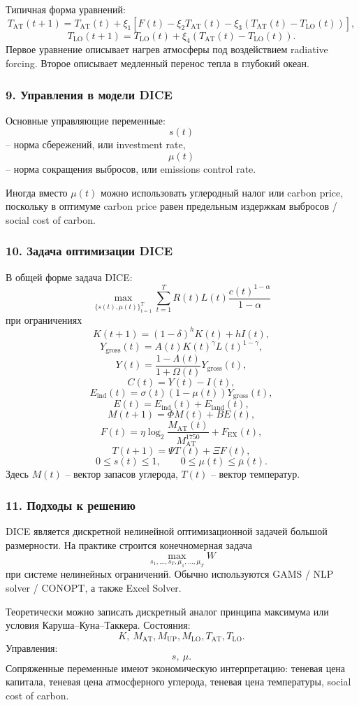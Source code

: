 \documentclass[12pt,a4paper]{article}
\begin{document}
Типичная форма уравнений:
\[
T_{\mathrm{AT}}(t+1)=T_{\mathrm{AT}}(t)+\xi_1\left[F(t)-\xi_2T_{\mathrm{AT}}(t)-\xi_3(T_{\mathrm{AT}}(t)-T_{\mathrm{LO}}(t))\right],
\]
\[
T_{\mathrm{LO}}(t+1)=T_{\mathrm{LO}}(t)+\xi_4(T_{\mathrm{AT}}(t)-T_{\mathrm{LO}}(t)).
\]
Первое уравнение описывает нагрев атмосферы под воздействием radiative forcing. Второе описывает медленный перенос тепла в глубокий океан.

\subsubsection*{9. Управления в модели DICE}
Основные управляющие переменные:
\[
s(t)
\]
-- норма сбережений, или investment rate,
\[
\mu(t)
\]
-- норма сокращения выбросов, или emissions control rate.

Иногда вместо $\mu(t)$ можно использовать углеродный налог или carbon price, поскольку в оптимуме carbon price равен предельным издержкам выбросов / social cost of carbon.

\subsubsection*{10. Задача оптимизации DICE}
В общей форме задача DICE:
\[
\max_{\{s(t),\mu(t)\}_{t=1}^{T}}\sum_{t=1}^{T}R(t)L(t)\frac{c(t)^{1-\alpha}}{1-\alpha}
\]
при ограничениях
\[
K(t+1)=(1-\delta)^hK(t)+hI(t),
\]
\[
Y_{\mathrm{gross}}(t)=A(t)K(t)^\gamma L(t)^{1-\gamma},
\]
\[
Y(t)=\frac{1-\Lambda(t)}{1+\Omega(t)}Y_{\mathrm{gross}}(t),
\]
\[
C(t)=Y(t)-I(t),
\]
\[
E_{\mathrm{ind}}(t)=\sigma(t)(1-\mu(t))Y_{\mathrm{gross}}(t),
\]
\[
E(t)=E_{\mathrm{ind}}(t)+E_{\mathrm{land}}(t),
\]
\[
M(t+1)=\Phi M(t)+BE(t),
\]
\[
F(t)=\eta\log_2\frac{M_{\mathrm{AT}}(t)}{M_{\mathrm{AT}}^{1750}}+F_{\mathrm{EX}}(t),
\]
\[
T(t+1)=\Psi T(t)+\Xi F(t),
\]
\[
0\le s(t)\le 1,\qquad 0\le \mu(t)\le \bar\mu(t).
\]
Здесь $M(t)$ -- вектор запасов углерода, $T(t)$ -- вектор температур.

\subsubsection*{11. Подходы к решению}
DICE является дискретной нелинейной оптимизационной задачей большой размерности. На практике строится конечномерная задача
\[
\max_{s_1,\ldots,s_T,\mu_1,\ldots,\mu_T}W
\]
при системе нелинейных ограничений. Обычно используются GAMS / NLP solver / CONOPT, а также Excel Solver.

Теоретически можно записать дискретный аналог принципа максимума или условия Каруша--Куна--Таккера. Состояния:
\[
K,\ M_{\mathrm{AT}},M_{\mathrm{UP}},M_{\mathrm{LO}},T_{\mathrm{AT}},T_{\mathrm{LO}}.
\]
Управления:
\[
s,\ \mu.
\]
Сопряженные переменные имеют экономическую интерпретацию: теневая цена капитала, теневая цена атмосферного углерода, теневая цена температуры, social cost of carbon.
\end{document}
